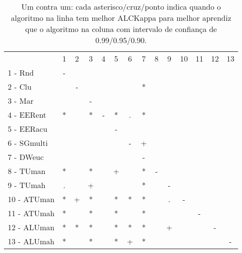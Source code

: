 \begin{table}[h]
\caption{Um contra um: cada asterisco/cruz/ponto indica quando o algoritmo na linha tem melhor ALCKappa para melhor aprendiz que o algoritmo na coluna com intervalo de confiança de 0.99/0.95/0.90.}
\begin{center}
\begin{tabular}{lcc|cc|cc|cc|cc|cc|c}
 			& 1 & 2 & 3 & 4 & 5 & 6 & 7 & 8 & 9 & 10 & 11 & 12 & 13\\
1 - Rnd  	& - &   &   &   &   &   &   &   &   &   &   &   &   \\
2 - Clu  	&   & - &   &   &   &   & * &   &   &   &   &   &   \\ \hline
3 - Mar  	&   &   & - &   &   &   &   &   &   &   &   &   &   \\
4 - EERent	& * &   & * & - & * & . & * &   &   &   &   &   &   \\ \hline
5 - EERacu	&   &   &   &   & - &   &   &   &   &   &   &   &   \\
6 - SGmulti	&   &   &   &   &   & - & + &   &   &   &   &   &   \\ \hline
7 - DWeuc	&   &   &   &   &   &   & - &   &   &   &   &   &   \\
8 - TUman	& * &   & * &   & + &   & * & - &   &   &   &   &   \\ \hline
9 - TUmah	& . &   & + &   &   &   & * &   & - &   &   &   &   \\
10 - ATUman	& * & + & * &   & * & * & * &   & . & - &   &   &   \\ \hline
11 - ATUmah	& * &   & * &   & * &   & * &   &   &   & - &   &   \\
12 - ALUman	& * & * & * &   & * & * & * &   & + &   &   & - &   \\ \hline
13 - ALUmah	& * &   & * &   & * & + & * &   &   &   &   &   & - \\\end{tabular}
\label{stratsALCKappaFriedbestRedux}
\end{center}
\end{table}